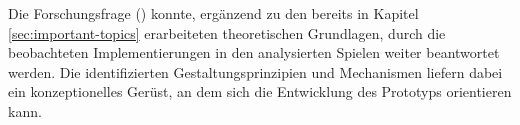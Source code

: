 Die Forschungsfrage () konnte, ergänzend zu den bereits in Kapitel \ref{sec:important-topics} erarbeiteten theoretischen Grundlagen, durch die beobachteten Implementierungen in den analysierten Spielen weiter beantwortet werden. Die identifizierten Gestaltungsprinzipien und Mechanismen liefern dabei ein  konzeptionelles Gerüst, an dem sich die Entwicklung des Prototyps orientieren kann.
